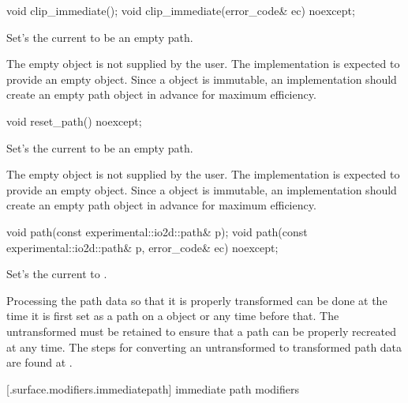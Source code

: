 \begin{itemdecl}
void clip_immediate();
void clip_immediate(error_code& ec) noexcept;
\end{itemdecl}
\begin{itemdescr}
	\pnum
	\effects
	Set's the current  to be an empty path.
	
	\pnum
	\realnotes
	The empty  object is not supplied by the user. The implementation is expected to provide an empty  object. Since a  object is immutable, an implementation should create an empty path object in advance for maximum efficiency.
\end{itemdescr}

\begin{itemdecl}
void reset_path() noexcept;
\end{itemdecl}
\begin{itemdescr}
	\pnum
	\effects
	Set's the current  to be an empty path.
	
	\pnum
	\realnotes
	The empty  object is not supplied by the user. The implementation is expected to provide an empty  object. Since a  object is immutable, an implementation should create an empty path object in advance for maximum efficiency.
\end{itemdescr}

\begin{itemdecl}
void path(const experimental::io2d::path& p);
void path(const experimental::io2d::path& p, error_code& ec) noexcept;
\end{itemdecl}
\begin{itemdescr}
	\pnum
	\effects
	Set's the current  to .
	
	\pnum
	\remarks
	Processing the path data so that it is properly transformed can be done at the time it is first set as a path on a  object or any time before that. The untransformed  must be retained to ensure that a path can be properly recreated at any time. The steps for converting an untransformed  to transformed path data are found at .
\end{itemdescr}

 [\iotwod.surface.modifiers.immediatepath] { immediate path modifiers}

